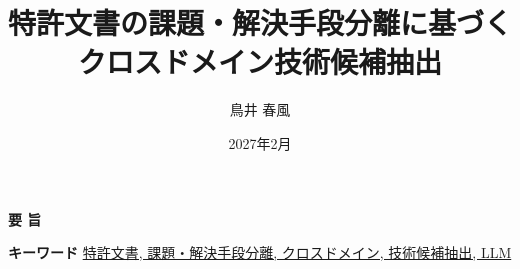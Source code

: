 \documentclass{../my_bthesis}
\title{特許文書の課題・解決手段分離に基づく\\クロスドメイン技術候補抽出}
\author{鳥井 春風}
\date{2027年2月}
\begin{document}
\maketitle

\startabstractpage
{}

\begin{center}
  {\Large \textbf{要 \quad 旨}}
\end{center}



\vspace*{1mm}
\begin{center}
\noindent \textbf{キーワード} \underline{特許文書, 課題・解決手段分離, クロスドメイン, 技術候補抽出, LLM}
\end{center}
\end{document}
